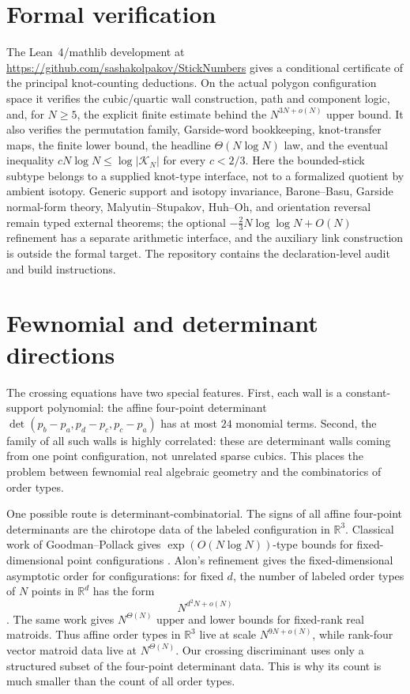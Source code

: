 \documentclass[11pt]{article}
\theoremstyle{remark}
\theoremstyle{plain}
\newcommand{\R}{\mathbb{R}}
\newcommand{\Kcal}{\mathcal{K}}
\begin{document}
\section{Formal verification}

The Lean~4/mathlib development at
\url{https://github.com/sashakolpakov/StickNumbers} gives a conditional
certificate of the principal knot-counting deductions.  On the actual polygon
configuration space it verifies the cubic/quartic wall construction, path and
component logic, and, for \(N\ge5\), the explicit finite estimate behind the
\(N^{3N+o(N)}\) upper bound.  It also verifies the permutation family,
Garside-word bookkeeping, knot-transfer maps, the finite lower bound, the
headline \(\Theta(N\log N)\) law, and the eventual inequality
\(cN\log N\le\log|\Kcal_N|\) for every \(c<2/3\).  Here the bounded-stick
subtype belongs to a supplied knot-type interface, not to a formalized quotient
by ambient isotopy.  Generic support and isotopy invariance, Barone--Basu,
Garside normal-form theory, Malyutin--Stupakov, Huh--Oh, and orientation
reversal remain typed external theorems; the optional
\(-\frac23N\log\log N+O(N)\) refinement has a separate arithmetic interface,
and the auxiliary link construction is outside the formal target.  The
repository contains the declaration-level audit and build instructions.

\section{Fewnomial and determinant directions}

The crossing equations have two special features.  First, each wall is a
constant-support polynomial: the affine four-point determinant
\(\det(p_b-p_a,p_d-p_c,p_c-p_a)\) has at most \(24\) monomial terms.  Second,
the family of all such walls is highly correlated: these are determinant walls
coming from one point configuration, not unrelated sparse cubics.  This places
the problem between fewnomial real algebraic geometry and the combinatorics of
order types.

One possible route is determinant-combinatorial.  The signs of all affine
four-point determinants are the chirotope data of the labeled configuration in
\(\R^3\).  Classical work of Goodman--Pollack gives
\(\exp(O(N\log N))\)-type bounds for fixed-dimensional point configurations
\cite{GoodmanPollack}.  Alon's refinement gives the fixed-dimensional
asymptotic order for configurations: for fixed \(d\), the number of labeled
order types of \(N\) points in \(\R^d\) has the form
\[
    N^{d^2N+o(N)}
\]
\cite{AlonMatroids}.  The same work gives \(N^{\Theta(N)}\) upper and lower
bounds for fixed-rank real matroids.  Thus affine order types in \(\R^3\) live
at scale \(N^{9N+o(N)}\), while rank-four vector matroid data live at
\(N^{\Theta(N)}\).  Our crossing discriminant uses only a structured subset of
the four-point determinant data.  This is why its count is much smaller than
the count of all order types.
\end{document}
